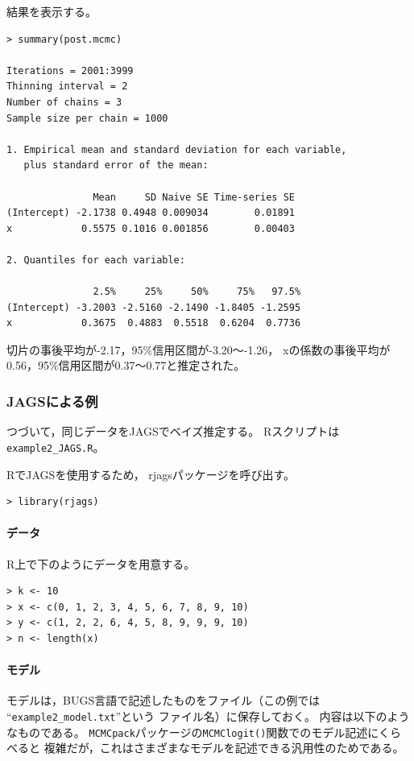 \documentclass[11pt,uplatex]{jsarticle}
\begin{document}
結果を表示する。
\begin{lstlisting}
> summary(post.mcmc)

Iterations = 2001:3999
Thinning interval = 2 
Number of chains = 3 
Sample size per chain = 1000 

1. Empirical mean and standard deviation for each variable,
   plus standard error of the mean:

               Mean     SD Naive SE Time-series SE
(Intercept) -2.1738 0.4948 0.009034        0.01891
x            0.5575 0.1016 0.001856        0.00403

2. Quantiles for each variable:

               2.5%     25%     50%     75%   97.5%
(Intercept) -3.2003 -2.5160 -2.1490 -1.8405 -1.2595
x            0.3675  0.4883  0.5518  0.6204  0.7736

\end{lstlisting}
切片の事後平均が-2.17，95\%信用区間が-3.20〜-1.26，
xの係数の事後平均が0.56，95\%信用区間が0.37〜0.77と推定された。


\subsubsection{JAGSによる例}

つづいて，同じデータを\textsf{JAGS}でベイズ推定する。
\textsf{R}スクリプトは\texttt{example2\_JAGS.R}。


\textsf{R}で\textsf{JAGS}を使用するため，
\textsf{rjags}パッケージを呼び出す。
\begin{lstlisting}
> library(rjags)
\end{lstlisting}

\paragraph{データ}
\textsf{R}上で下のようにデータを用意する。
\begin{lstlisting}
> k <- 10
> x <- c(0, 1, 2, 3, 4, 5, 6, 7, 8, 9, 10)
> y <- c(1, 2, 2, 6, 4, 5, 8, 9, 9, 9, 10)
> n <- length(x)
\end{lstlisting}


\paragraph{モデル}
モデルは，BUGS言語で記述したものをファイル（この例では
``\texttt{example2\_model.txt}''という
ファイル名）に保存しておく。
内容は以下のようなものである。
\texttt{MCMCpack}パッケージの\texttt{MCMClogit()}関数でのモデル記述にくらべると
複雑だが，これはさまざまなモデルを記述できる汎用性のためである。
\end{document}
